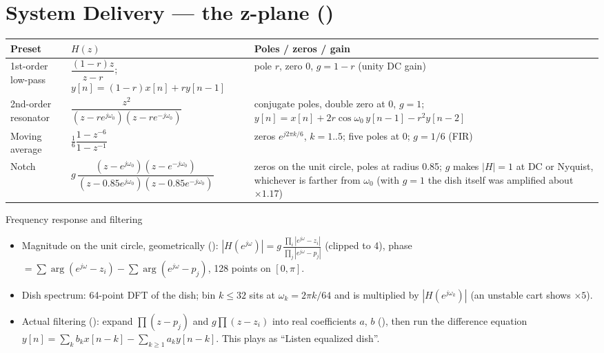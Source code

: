 \documentclass[11pt,a4paper]{article}
\begin{document}
\section{System Delivery --- the z-plane ()}
\begin{longtable}{@{}P{2.6cm}P{5.6cm}P{7.3cm}@{}}
\toprule
Preset & $H(z)$ & Poles / zeros / gain \\
\midrule
\endhead
1st-order low-pass & $\dfrac{(1-r)z}{z-r}$;\ $y[n]=(1-r)x[n]+ry[n-1]$ & pole $r$, zero $0$, $g=1-r$ (unity DC gain) \\
2nd-order resonator & $\dfrac{z^2}{(z-re^{j\omega_0})(z-re^{-j\omega_0})}$ & conjugate poles, double zero at 0, $g=1$; $y[n]=x[n]+2r\cos\omega_0\,y[n-1]-r^2y[n-2]$ \\
Moving average & $\tfrac16\dfrac{1-z^{-6}}{1-z^{-1}}$ & zeros $e^{j2\pi k/6}$, $k=1..5$; five poles at 0; $g=1/6$ (FIR) \\
Notch & $g\,\dfrac{(z-e^{j\omega_0})(z-e^{-j\omega_0})}{(z-0.85e^{j\omega_0})(z-0.85e^{-j\omega_0})}$ & zeros on the unit circle, poles at radius 0.85; $g$ makes $|H|=1$ at DC or Nyquist, whichever is farther from $\omega_0$ (with $g=1$ the dish itself was amplified about $\times1.17$) \\
\bottomrule
\end{longtable}

\begin{mathbox}{Frequency response and filtering}
\begin{itemize}[leftmargin=*]
\item Magnitude on the unit circle, geometrically ():
  $|H(e^{j\omega})|=g\,\frac{\prod_i|e^{j\omega}-z_i|}{\prod_j|e^{j\omega}-p_j|}$ (clipped to 4),
  phase $=\sum\arg(e^{j\omega}-z_i)-\sum\arg(e^{j\omega}-p_j)$, 128 points on $[0,\pi]$.
\item Dish spectrum: 64-point DFT of the dish; bin $k\le32$ sits at $\omega_k=2\pi k/64$ and is
  multiplied by $|H(e^{j\omega_k})|$ (an unstable cart shows $\times5$).
\item Actual filtering (): expand $\prod(z-p_j)$ and $g\prod(z-z_i)$ into real
  coefficients $a$, $b$ (), then run the difference equation
  $y[n]=\sum_k b_kx[n-k]-\sum_{k\ge1}a_ky[n-k]$. This plays as ``Listen equalized dish''.
\end{itemize}
\end{mathbox}
\end{document}
